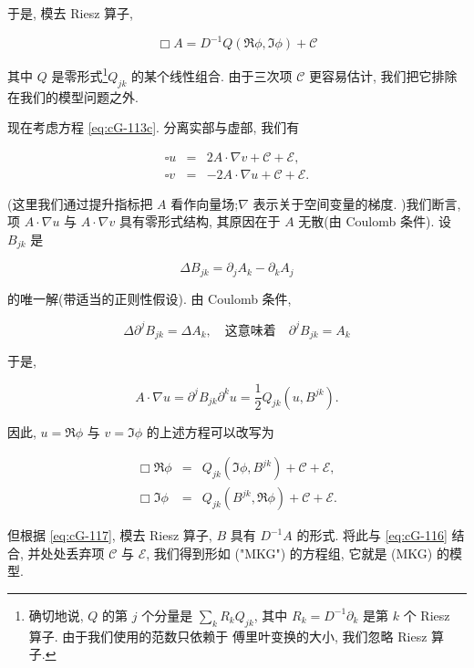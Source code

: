 于是, 模去 Riesz 算子, 

\begin{equation}
\Box A = D^{-1}Q\left(\Re\phi,  \Im\phi\right) + \mathcal{C}\label{eq:cG-116}
\end{equation}

其中 $Q$ 是零形式\footnote{确切地说, $Q$ 的第 $j$ 个分量是 $\sum_{k}R_kQ_{jk}$, 其中 $R_k = D^{-1}\partial_k$ 是第 $k$ 个 Riesz 算子. 由于我们使用的范数只依赖于 傅里叶变换的大小, 我们忽略 Riesz 算子. }$Q_{jk}$ 的某个线性组合. 由于三次项 $\mathcal{C}$ 更容易估计, 我们把它排除在我们的模型问题之外. 

现在考虑方程 \eqref{eq:cG-113c}. 分离实部与虚部, 我们有

\[
\begin{array}{rcl}
\square u &=& 2A\cdot\nabla v + \mathcal{C} + \mathcal{E},  \\
\square v &=& -2A\cdot\nabla u + \mathcal{C} + \mathcal{E}.
\end{array}
\]

(这里我们通过提升指标把 $A$ 看作向量场;$\nabla$ 表示关于空间变量的梯度. )我们断言, 项 $A\cdot\nabla u$ 与 $A\cdot\nabla v$ 具有零形式结构, 其原因在于 $A$ 无散(由 Coulomb 条件). 设 $B_{jk}$ 是

\begin{equation}
\Delta B_{jk} = \partial_{j}A_{k} - \partial_{k}A_{j}\label{eq:cG-117}
\end{equation}

的唯一解(带适当的正则性假设). 由 Coulomb 条件, 

\begin{equation}
\Delta\partial^{j}B_{jk} = \Delta A_{k},  \quad \text{这意味着} \quad \partial^{j}B_{jk} = A_{k}\label{eq:cG-118}
\end{equation}

于是, 

\[
A\cdot\nabla u = \partial^{j}B_{jk}\partial^{k}u = \frac{1}{2}Q_{jk}(u,  B^{jk}).
\]

因此, $u = \Re\phi$ 与 $v = \Im\phi$ 的上述方程可以改写为

\[
\begin{array}{rcl}
\Box\Re\phi &=& Q_{jk}(\Im\phi,  B^{jk}) + \mathcal{C} + \mathcal{E},  \\
\Box\Im\phi &=& Q_{jk}(B^{jk},  \Re\phi) + \mathcal{C} + \mathcal{E}.
\end{array}
\]

但根据 \eqref{eq:cG-117}, 模去 Riesz 算子, $B$ 具有 $D^{-1}A$ 的形式. 将此与 \eqref{eq:cG-116} 结合, 并处处丢弃项 $\mathcal{C}$ 与 $\mathcal{E}$, 我们得到形如 ("MKG") 的方程组, 它就是 (MKG) 的模型. 

